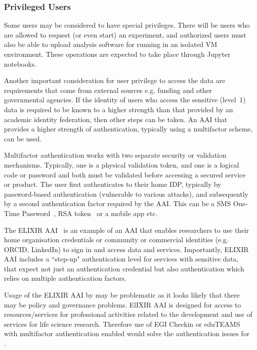 \documentclass[12pt,a4paper]{article}
\begin{document}
\subsubsection{Privileged Users}
\label{ssec:high}

Some \EC users may be considered to have special privileges. 
There will be users who are allowed to request (or even start) an experiment, and authorized users must also be able to upload analysis software for running in an isolated VM environment. These operations are expected to take place through Jupyter~\cite{jupyter} notebooks.

Another important consideration for user privilege to access the \ED data are requirements that come from external sources e.g. funding and other governmental agencies.
If the identity of users who access the sensitive (level~1) \ED data is required to be known to a higher strength than that provided by an academic identity federation, then other steps can be taken.
An AAI that provides a higher strength of authentication, typically using a multifactor scheme, can be used.

Multifactor authentication works with two separate security or validation mechanisms. 
Typically, one is a physical validation token, and one is a logical code or password and both must be validated before accessing a secured service or product.
The user first authenticates to their home IDP, typically by password-based authentication (vulnerable to various attacks), and subsequently by a second authentication factor required by the AAI.
This can be a SMS One-Time Password~\cite{otp}, RSA token~\cite{rsa-token} or a mobile app etc.

The ELIXIR AAI~\cite{elixir-aai} is an example of an AAI that enables researchers to use their home organisation credentials or community or commercial identities (e.g. ORCID, LinkedIn) to sign in and access data and services.
Importantly, ELIXIR AAI includes a ``step-up" authentication level for services with sensitive data, that expect not just an authentication credential but also authentication which relies on multiple authentication factors.

Usage of the ELIXIR AAI by \ED may be problematic as it looks likely that there may be policy and governance problems.
ElIXIR AAI is designed for access to resources/services for professional activities related to the development and use of services for life science research.
Therefore use of EGI Checkin or eduTEAMS with multifactor authentication enabled would solve the authentication issues for \ED.
\end{document}
